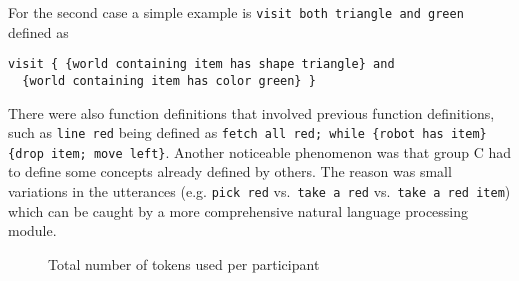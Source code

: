 \documentclass[letterpaper, 10 pt, conference]{ieeeconf}  %
\begin{document}
For the second case a simple example is
\lstinline{visit both triangle and green} defined as
\begin{lstlisting}
visit { {world containing item has shape triangle} and
  {world containing item has color green} }
\end{lstlisting}
There were also function definitions that involved previous function definitions,
such as \lstinline{line red} being defined as
\lstinline$fetch all red; while {robot has item} {drop item; move left}$.
Another noticeable phenomenon was that group C had to define some concepts already defined by others.
The reason was small variations in the utterances (e.g. \lstinline{pick red} vs.\
\lstinline{take a red} vs.\ \lstinline{take a red item}) which can be caught by a more
comprehensive natural language processing module.


\begin{figure}[t!]

	\caption{Total number of tokens used per participant}
	\label{fig:numTokens}
	\end{figure}
\end{document}
